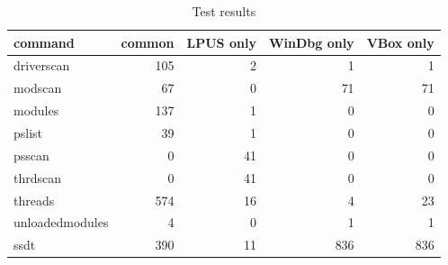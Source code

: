 \begin{table}[t]
\centering
\begin{tabular}{lrrrr}
command         & common & LPUS only & WinDbg only & VBox only \\
\hline
driverscan      & 105    & 2         & 1           & 1         \\
modscan         & 67     & 0         & 71          & 71        \\
modules         & 137    & 1         & 0           & 0         \\
pslist          & 39     & 1         & 0           & 0         \\
psscan          & 0      & 41        & 0           & 0         \\
thrdscan        & 0      & 41        & 0           & 0         \\
threads         & 574    & 16        & 4           & 23        \\
unloadedmodules & 4      & 0         & 1           & 1         \\
ssdt            & 390    & 11        & 836         & 836       \\
\hline
\end{tabular}
\caption{Test results}
\label{tab:testresult}
\end{table}
